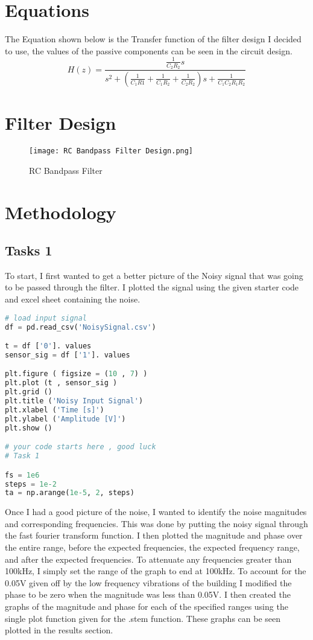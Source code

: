 \documentclass[12pt]{report}
\begin{document}
\section{Equations}
The Equation shown below is the Transfer function of the filter design I
decided to use, the values of the passive components can be seen in the
circuit design.
\begin{equation}
    H(z) = \frac{\frac{1}{C_{2}R_{2}}s}{s^{2} + (\frac{1}{C_{1}R{1}} + \frac{1}{C_{1}R_{2}} + \frac{1}{C_{2}R_{2}})s + \frac{1}{C_{1}C_{2}R_{1}R_{2}}}
\end{equation}

\section{Filter Design}
\begin{figure}[H]
\begin{center}
\caption{RC Bandpass Filter}
\texttt{[image: RC Bandpass Filter Design.png]}
\end{center}
\end{figure}
 
\section{Methodology}
\subsection{Tasks 1}
To start, I first wanted to get a better picture of the Noisy signal that
was going to be passed through the filter. I plotted the signal using
the given starter code and excel sheet containing the noise.

\begin{lstlisting}[language=Python]
# load input signal
df = pd.read_csv('NoisySignal.csv')

t = df ['0']. values
sensor_sig = df ['1']. values

plt.figure ( figsize = (10 , 7) )
plt.plot (t , sensor_sig )
plt.grid ()
plt.title ('Noisy Input Signal')
plt.xlabel ('Time [s]')
plt.ylabel ('Amplitude [V]')
plt.show ()

# your code starts here , good luck
# Task 1

fs = 1e6
steps = 1e-2
ta = np.arange(1e-5, 2, steps)
\end{lstlisting}

Once I had a good picture of the noise, I wanted to identify the noise
magnitudes and corresponding frequencies. This was done by putting the
noisy signal through the fast fourier transform function. I then plotted the
magnitude and phase over the entire range, before the expected frequencies,
the expected frequency range, and after the expected frequencies. To 
attenuate any frequencies greater than 100kHz, I simply set the range 
of the graph to end at 100kHz. To account for the 0.05V given off by the 
low frequency vibrations of the building I modified the phase to be zero
when the magnitude was less than 0.05V. I then created the graphs of the
magnitude and phase for each of the specified ranges using the single plot
function given for the .stem function. These graphs can be seen plotted in
the results section.
\end{document}
